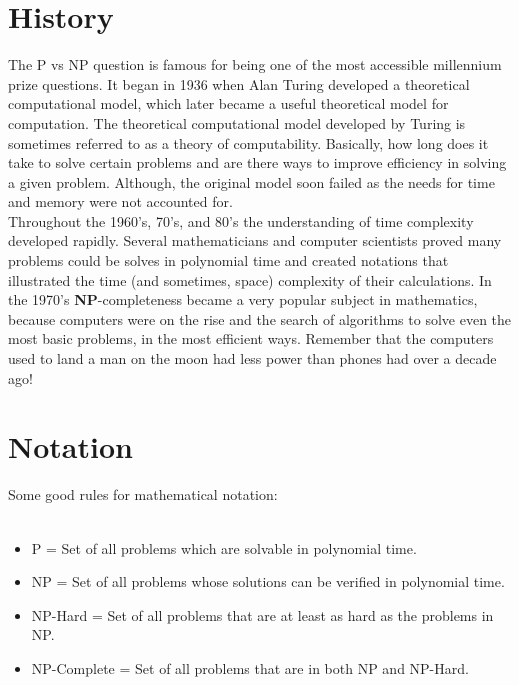 \documentclass[14pt]{article}
\theoremstyle{definition}
\theoremstyle{definition}
\begin{document}
\newpage
\section*{History}
\hspace*{.25 cm} The P vs NP question is famous for being one of the most accessible millennium prize questions\cite{Sipser}. It began in 1936 when Alan Turing developed a theoretical computational model, which later became a useful theoretical model for computation. The theoretical computational model developed by Turing is sometimes referred to as a theory of computability. Basically, how long does it take to solve certain problems and are there ways to improve efficiency in solving a given problem. Although, the original model soon failed as the needs for time and memory were not accounted for\cite{Fortnow}.
\\
\vspace*{.25 cm}
\hspace*{.25 cm} Throughout the 1960's, 70's, and 80's the understanding of time complexity developed rapidly. Several mathematicians and computer scientists proved many problems could be solves in polynomial time and created notations that illustrated the time (and sometimes, space) complexity of their calculations. In the 1970's \textbf{NP}-completeness became a very popular subject in mathematics, because computers were on the rise and the search of algorithms to solve even the most basic problems, in the most efficient ways\cite{Fortnow}. Remember that the computers used to land a man on the moon had less power than phones had over a decade ago!\\

\vspace*{.5 cm}
\section*{Notation}
Some good rules for mathematical notation:
\\
\\
\begin{itemize}
\item P = Set of all problems which are solvable in polynomial time.
\item NP = Set of all problems whose solutions can be verified in polynomial time.
\item NP-Hard = Set of all problems that are at least as hard as the problems in NP.
\item NP-Complete = Set of all problems that are in both NP and NP-Hard.
\end{itemize}
\newpage
\end{document}
